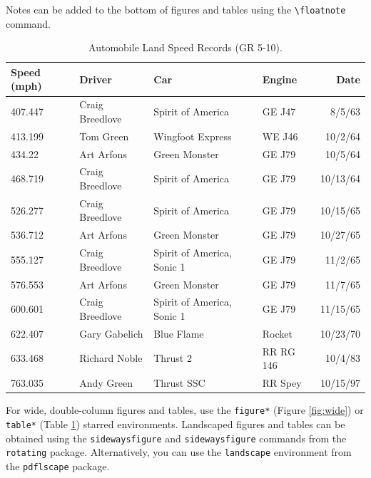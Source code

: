 \documentclass[biblatex,nonblind]{apsr_submission}
\begin{document}
Notes can be added to the bottom of figures and tables using the \verb|\floatnote| command.


\begin{table}
\caption{Automobile Land Speed Records (GR 5-10).}
\label{tab:wide}

\begin{tabular}{l l l l r}
Speed (mph) & Driver          & Car                        & Engine    & Date     \\
\midrule
407.447     & Craig Breedlove & Spirit of America          & GE J47    & 8/5/63   \\
413.199     & Tom Green       & Wingfoot Express           & WE J46    & 10/2/64  \\
434.22      & Art Arfons      & Green Monster              & GE J79    & 10/5/64  \\
468.719     & Craig Breedlove & Spirit of America          & GE J79    & 10/13/64 \\
526.277     & Craig Breedlove & Spirit of America          & GE J79    & 10/15/65 \\
536.712     & Art Arfons      & Green Monster              & GE J79    & 10/27/65 \\
555.127     & Craig Breedlove & Spirit of America, Sonic 1 & GE J79    & 11/2/65  \\
576.553     & Art Arfons      & Green Monster              & GE J79    & 11/7/65  \\
600.601     & Craig Breedlove & Spirit of America, Sonic 1 & GE J79    & 11/15/65 \\
622.407     & Gary Gabelich   & Blue Flame                 & Rocket    & 10/23/70 \\
633.468     & Richard Noble   & Thrust 2                   & RR RG 146 & 10/4/83  \\
763.035     & Andy Green      & Thrust SSC                 & RR Spey   & 10/15/97\\
\end{tabular}


\end{table}

For wide, double-column figures and tables, use the \verb|figure*| (Figure \ref{fig:wide}) or \verb|table*| (Table \ref{tab:wide}) starred environments. Landscaped figures and tables can be obtained using the \texttt{sidewaysfigure} and \texttt{sidewaysfigure} commands from the \texttt{rotating} package. Alternatively, you can use the \texttt{landscape} environment from the \texttt{pdflscape} package.
\end{document}
